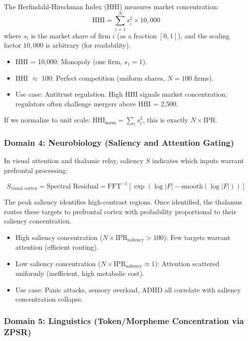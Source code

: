 \documentclass[11pt,oneside]{article}
\theoremstyle{definition}
\begin{document}
The Herfindahl-Hirschman Index (HHI) measures market concentration:
\[
\text{HHI} = \sum_{i=1}^N s_i^2 \times 10,000
\]
where $s_i$ is the market share of firm $i$ (as a fraction $[0, 1]$), and the scaling factor $10,000$ is arbitrary (for readability).

\begin{itemize}
  \item HHI = 10,000: Monopoly (one firm, $s_1 = 1$).
  \item HHI \ensuremath{\approx} 100: Perfect competition (uniform shares, $N = 100$ firms).
  \item Use case: Antitrust regulation. High HHI signals market concentration; regulators often challenge mergers above HHI = 2,500.
\end{itemize}

If we normalize to unit scale: $\text{HHI}_{\text{norm}} = \sum_i s_i^2$, this is exactly $N \times \text{IPR}$.

\subsubsection{Domain 4: Neurobiology (Saliency and Attention Gating)}

In visual attention and thalamic relay, saliency $S$ indicates which inputs warrant prefrontal processing:

\[
S_{\text{visual cortex}} = \text{Spectral Residual} = \text{FFT}^{-1}\left[\exp(\log|F| - \text{smooth}(\log|F|))\right]
\]

The peak saliency identifies high-contrast regions. Once identified, the thalamus routes these targets to prefrontal cortex with probability proportional to their saliency concentration.

\begin{itemize}
  \item High saliency concentration ($N \times \text{IPR}_{\text{saliency}} > 100$): Few targets warrant attention (efficient routing).
  \item Low saliency concentration ($N \times \text{IPR}_{\text{saliency}} \approx 1$): Attention scattered uniformly (inefficient, high metabolic cost).
  \item Use case: Panic attacks, sensory overload, ADHD all correlate with saliency concentration collapse.
\end{itemize}

\subsubsection{Domain 5: Linguistics (Token/Morpheme Concentration via ZPSR)}
\end{document}
